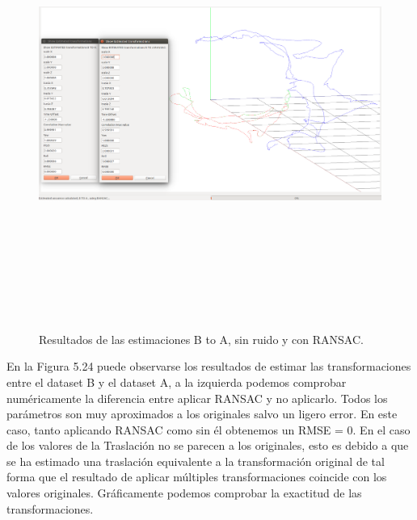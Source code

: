 \begin{figure}[H]
\begin{center}
\label{fig:opciones de View}\includegraphics[height=14.0cm,width=18.0cm]{img/cap6/newData_EscalaTraslaRota_BA.png}
\hspace{0.5cm}

\end{center}

\caption{Resultados de las estimaciones B to A, sin ruido y con RANSAC.}
\end{figure}

En la Figura 5.24 puede observarse los resultados de estimar las transformaciones entre el dataset B y el dataset A, a la izquierda podemos comprobar numéricamente la diferencia entre aplicar RANSAC y no aplicarlo. Todos los parámetros son muy aproximados a los originales salvo un ligero error. En este caso, tanto aplicando RANSAC como sin él obtenemos un RMSE =  0. En el caso de los valores de la Traslación no se parecen a los originales, esto es debido a que se ha estimado una traslación equivalente a la transformación original de tal forma que el resultado de aplicar múltiples transformaciones coincide con los valores originales. Gráficamente podemos comprobar la exactitud de las transformaciones.

